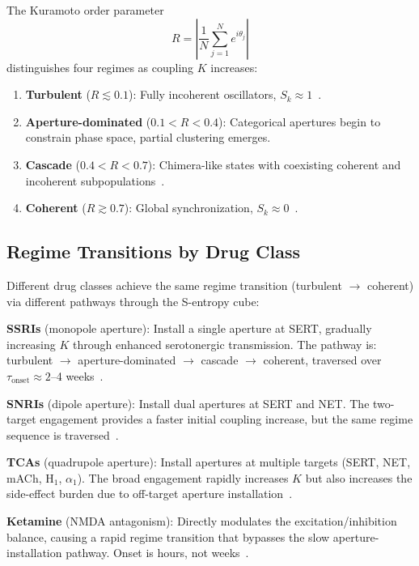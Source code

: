 \documentclass[10pt,twocolumn]{article}
\theoremstyle{definition}
\theoremstyle{remark}
\begin{document}
The Kuramoto order parameter~\cite{Kuramoto1984}
\begin{equation}
  R = \left|\frac{1}{N}\sum_{j=1}^{N} e^{i\theta_j}\right|
\end{equation}
distinguishes four regimes as coupling $K$ increases:
\begin{enumerate}[leftmargin=*]
  \item \textbf{Turbulent} ($R \lesssim 0.1$): Fully incoherent
        oscillators, $S_k \approx 1$~\cite{Acebron2005}.
  \item \textbf{Aperture-dominated} ($0.1 < R < 0.4$):
        Categorical apertures begin to constrain phase space,
        partial clustering emerges.
  \item \textbf{Cascade} ($0.4 < R < 0.7$): Chimera-like
        states with coexisting coherent and incoherent
        subpopulations~\cite{Panaggio2015}.
  \item \textbf{Coherent} ($R \gtrsim 0.7$): Global
        synchronization, $S_k \approx 0$~\cite{Fries2005,Buzsaki2006}.
\end{enumerate}

\subsection{Regime Transitions by Drug Class}

Different drug classes achieve the same regime transition
(turbulent $\to$ coherent) via different pathways through
the S-entropy cube:

\textbf{SSRIs} (monopole aperture): Install a single aperture
at SERT, gradually increasing $K$ through enhanced serotonergic
transmission.  The pathway is:
turbulent $\to$ aperture-dominated $\to$ cascade $\to$ coherent,
traversed over $\tau_{\text{onset}} \approx 2$--4 weeks~\cite{Stahl2021}.

\textbf{SNRIs} (dipole aperture): Install dual apertures at
SERT and NET.  The two-target engagement provides a faster
initial coupling increase, but the same regime sequence
is traversed~\cite{Cipriani2018}.

\textbf{TCAs} (quadrupole aperture): Install apertures at
multiple targets (SERT, NET, mACh, H$_1$, $\alpha_1$).
The broad engagement rapidly increases $K$ but also increases
the side-effect burden due to off-target aperture
installation~\cite{Roth2004,Owens1997}.

\textbf{Ketamine} (NMDA antagonism): Directly modulates the
excitation/inhibition balance, causing a rapid regime transition
that bypasses the slow aperture-installation pathway.
Onset is hours, not weeks~\cite{Berman2000,Zarate2006}.
\end{document}
